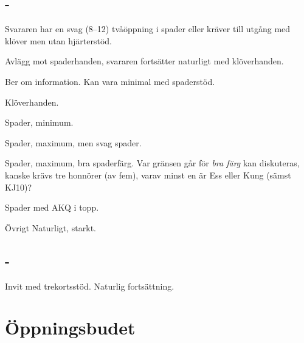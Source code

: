 \subsection{ - }

Svararen har en svag (8--12) tvåöppning i spader eller kräver till utgång
med klöver men utan hjärterstöd.

\begin{beskriv}
  \item[\spa{2}] Avlägg mot spaderhanden, svararen fortsätter naturligt med
    klöverhanden.
  \item[\NT{2}] Ber om information. Kan vara minimal med spaderstöd.
    \bbe
  \item[\kl{3}] Klöverhanden.
  \item[\ru{3}] Spader, minimum.
  \item[\hj{3}] Spader, maximum, men svag spader.
    \item[\spa{3}] Spader, maximum, bra spaderfärg. Var gränsen går för
      \emph{bra färg} kan diskuteras, kanske krävs tre honnörer (av fem),
      varav minst en är Ess eller Kung (sämst KJ10)?
    \item[\NT{3}] Spader med AKQ i topp.
      \ebe
      \item[Övrigt] Naturligt, starkt.
\end{beskriv}

\subsection{ - }

Invit med trekortsstöd. Naturlig fortsättning.

\section{{\"O}ppningsbudet }


